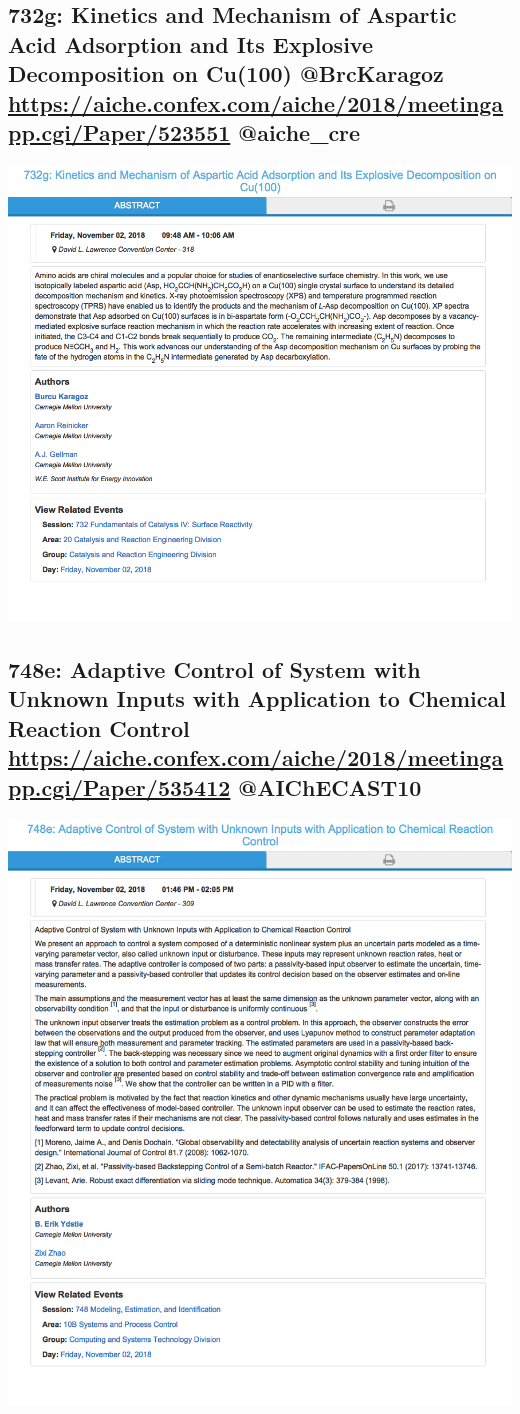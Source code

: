 \documentclass[11pt]{article}
\begin{document}
\subsection{732g: Kinetics and Mechanism of Aspartic Acid Adsorption and Its Explosive Decomposition on Cu(100)  @BrcKaragoz \url{https://aiche.confex.com/aiche/2018/meetingapp.cgi/Paper/523551} @aiche\_cre}
\label{sec:org2075e2b}
\begin{center}
\includegraphics[width=.9\linewidth]{./523551.png}
\end{center}
\subsection{748e: Adaptive Control of System with Unknown Inputs with Application to Chemical Reaction Control    \url{https://aiche.confex.com/aiche/2018/meetingapp.cgi/Paper/535412} @AIChECAST10}
\label{sec:orgc5c0f0c}
\begin{center}
\includegraphics[width=.9\linewidth]{./535412.png}
\end{center}
\end{document}
